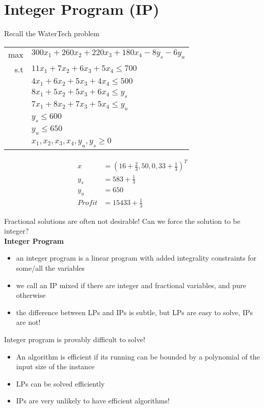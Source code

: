 \documentclass[letterpaper, 12pt]{article}
\begin{document}
{    \pagebreak
    \section{Integer Program (IP)}
    Recall the WaterTech problem\\
    \begin{center}
        \begin{tabular}{r l}
            max & $300x_1 + 260x_2 + 220x_3 + 180x_4 - 8y_s - 6y_u$\\
            s.t & $11x_1 + 7x_2 + 6x_3 + 5x_4 \leq 700$\\
            & $4x_1 + 6x_2 + 5x_3 + 4x_4 \leq 500$\\
            & $8x_1 + 5x_2 + 5x_3 + 6x_4 \leq y_s$\\
            & $7x_1 + 8x_2 + 7x_3 + 5x_4 \leq y_u$\\
            & $y_s \leq 600$\\
            & $y_u \leq 650$\\
            & $x_1, x_2, x_3, x_4, y_u, y_s \geq 0$\\
        \end{tabular}
    \end{center}

    \begin{align*}
        x &= (16 + \frac{2}{3}, 50, 0, 33 + \frac{1}{3})^T\\
        y_s &= 583 + \frac{1}{3}\\
        y_u &= 650\\
        Profit &= 15433 + \frac{1}{3}
    \end{align*}

    Fractional solutions are often not desirable! Can we force the solution to be integer?\\
    \bigskip
    {\large\textbf{Integer Program}}\\
    \begin{itemize}
        \item an integer program is a linear program with added integrality constraints for some/all the variables
        \item we call an IP mixed if there are integer and fractional variables, and pure otherwise
        \item the difference between LPs and IPs is subtle, but LPs are easy to solve, IPs are not!
    \end{itemize}
    Integer program is provably difficult to solve!\\
    \begin{itemize}
        \item An algorithm is efficient if its running can be bounded by a polynomial of the input size of the instance\\
        \item LPs can be solved efficiently
        \item IPs are very unlikely to have efficient algorithms!
    \end{itemize}

}
\end{document}
